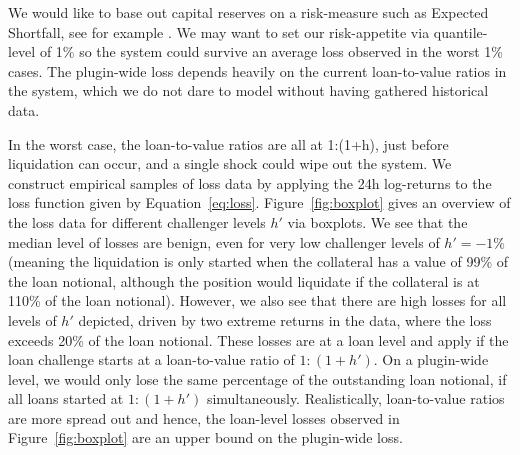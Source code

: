 \documentclass[english,11pt]{article}
\begin{document}
We would like to base out capital reserves on
a risk-measure such as Expected Shortfall, see for example \cite{mcneil2015quantitative}.
We may want to set our risk-appetite via quantile-level of 1\% so the system could survive
an average loss observed in the worst 1\% cases.
The plugin-wide loss depends heavily on the current loan-to-value ratios in the system, which
we do not dare to model without having gathered historical data.

In the worst case, the loan-to-value ratios are all at 1:(1+h), just before liquidation can occur,
and a single shock could wipe out the system. 
We construct empirical samples of loss data by applying the 24h log-returns to the loss function
given by Equation~\eqref{eq:loss}. Figure~\ref{fig:boxplot} gives an overview of the loss data for
different challenger levels $h'$ via boxplots. We see that
the median level of losses are benign, even for very low challenger levels of $h'=-1\%$ 
(meaning the liquidation is only started when the collateral has a value of 99\% of the loan
notional, although the position would liquidate if the collateral is at 110\% of the loan notional).
However, we also see that there are high losses for all levels of $h'$ depicted,
driven by two extreme returns in the data, where the loss exceeds 20\% of the loan notional.
These losses are at a loan level and apply if the loan challenge starts at a loan-to-value
ratio of $1:(1+h')$. On a plugin-wide level, we would only lose the same percentage of the
outstanding loan notional, if all loans started at $1:(1+h')$ simultaneously.
Realistically, loan-to-value ratios are more spread
out and hence, the loan-level losses observed in Figure~\ref{fig:boxplot} are an upper bound 
on the plugin-wide loss.
\end{document}
